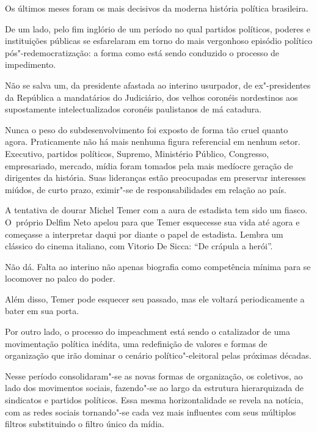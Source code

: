  

Os últimos meses foram os mais decisivos da moderna história política
brasileira.

De um lado, pelo fim inglório de um período no qual partidos políticos,
poderes e instituições públicas se esfarelaram em torno do mais
vergonhoso episódio político pós"-redemocratização: a forma como está
sendo conduzido o processo de impedimento.

Não se salva um, da presidente afastada ao interino usurpador, de
ex"-presidentes da República a mandatários do Judiciário, dos velhos
coronéis nordestinos aos supostamente intelectualizados coronéis
paulistanos de má catadura.

Nunca o peso do subdesenvolvimento foi exposto de forma tão cruel quanto
agora. Praticamente não há mais nenhuma figura referencial em nenhum
setor. Executivo, partidos políticos, Supremo, Ministério Público,
Congresso, empresariado, mercado, mídia foram tomados pela mais medíocre
geração de dirigentes da história. Suas lideranças estão preocupadas em
preservar interesses miúdos, de curto prazo, eximir"-se de
responsabilidades em relação ao país.

A tentativa de dourar Michel Temer com a aura de estadista tem sido um
fiasco. O~próprio Delfim Neto apelou para que Temer esquecesse sua vida
até agora e começasse a interpretar daqui por diante o papel de
estadista. Lembra um clássico do cinema italiano, com Vitorio De Sicca:
``De crápula a herói''.

Não dá. Falta ao interino não apenas biografia como competência mínima
para se locomover no palco do poder.

Além disso, Temer pode esquecer seu passado, mas ele voltará
periodicamente a bater em sua porta.

Por outro lado, o processo do impeachment está sendo o catalizador de
uma movimentação política inédita, uma redefinição de valores e formas
de organização que irão dominar o cenário político"-eleitoral pelas
próximas décadas.

Nesse período consolidaram"-se as novas formas de organização, os
coletivos, ao lado dos movimentos sociais, fazendo"-se ao largo da
estrutura hierarquizada de sindicatos e partidos políticos. Essa mesma
horizontalidade se revela na notícia, com as redes sociais tornando"-se
cada vez mais influentes com seus múltiplos filtros substituindo o
filtro único da mídia.


